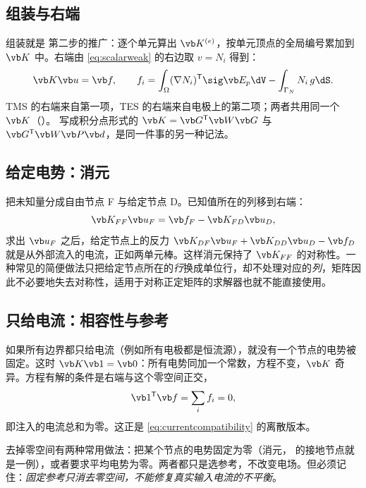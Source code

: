 \subsection{组装与右端}
组装就是 第二步的推广：逐个单元算出 $\vb K^{(e)}$，按单元顶点的全局编号累加到 $\vb K$ 中。右端由 \eqref{eq:scalarweak} 的右边取 $v=N_i$ 得到：
\begin{equation}
\vb K\vb u=\vb f,\qquad
f_i=\int_\Omega(\nabla N_i)^{\mathsf T}\sig\vb E_p\dV-\int_{\Gamma_N}N_i\,g\dS .
\label{eq:femscalar-system}
\end{equation}
TMS 的右端来自第一项，TES 的右端来自电极上的第二项；两者共用同一个 $\vb K$（）。 写成积分点形式的 $\vb K=\vb G^{\mathsf T}\vb W\vb G$ 与 $\vb G^{\mathsf T}\vb W\vb P\vb d$，是同一件事的另一种记法。

\subsection{给定电势：消元}
把未知量分成自由节点 F 与给定节点 D。已知值所在的列移到右端：
\begin{equation*}
\vb K_{FF}\vb u_F=\vb f_F-\vb K_{FD}\vb u_D ,
\end{equation*}
求出 $\vb u_F$ 之后，给定节点上的反力 $\vb K_{DF}\vb u_F+\vb K_{DD}\vb u_D-\vb f_D$ 就是从外部流入的电流，正如两单元棒。这样消元保持了 $\vb K_{FF}$ 的对称性。一种常见的简便做法只把给定节点所在的\emph{行}换成单位行，却不处理对应的\emph{列}，矩阵因此不必要地失去对称性，适用于对称正定矩阵的求解器也就不能直接使用。

\subsection{只给电流：相容性与参考}
如果所有边界都只给电流（例如所有电极都是恒流源），就没有一个节点的电势被固定。这时 $\vb K\vb 1=\vb 0$：所有电势同加一个常数，方程不变，$\vb K$ 奇异。方程有解的条件是右端与这个零空间正交，
\begin{equation*}
\vb 1^{\mathsf T}\vb f=\sum_if_i=0 ,
\end{equation*}
即注入的电流总和为零。这正是 \eqref{eq:currentcompatibility} 的离散版本。

去掉零空间有两种常用做法：把某个节点的电势固定为零（消元， 的接地节点就是一例），或者要求平均电势为零。两者都只是选参考，不改变电场。但必须记住：\emph{固定参考只消去零空间，不能修复真实输入电流的不平衡}。

